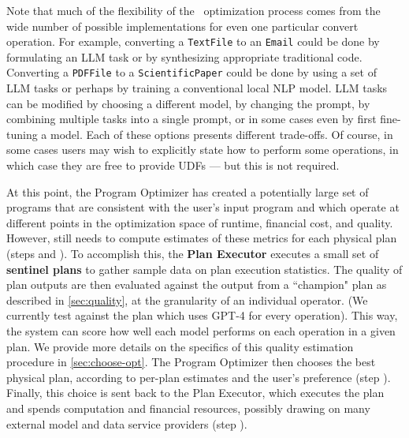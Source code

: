 Note that much of the flexibility of the \system\ optimization process comes from the wide number of possible implementations for even one particular convert operation. For example, converting a {\tt TextFile} to an {\tt Email} could be done by formulating an LLM task or by synthesizing appropriate traditional code. Converting a {\tt PDFFile} to a {\tt ScientificPaper} could be done by using a set of LLM tasks or perhaps by training a conventional local NLP model. LLM tasks can be modified by choosing a different model, by changing the prompt, by combining multiple tasks into a single prompt, or in some cases even by first fine-tuning a model. Each of these options presents different trade-offs. Of course, in some cases users may wish to explicitly state how to perform some operations, in which case they are free to provide UDFs --- but this is not required.

At this point, the Program Optimizer has created a potentially large set of programs that are consistent with the user's input program and which operate at different points in the optimization space of runtime, financial cost, and quality. However, \system{} still needs to compute estimates of these metrics for each physical plan (steps  and ). To accomplish this, the {\bf Plan Executor} executes a small set of {\bf sentinel plans} to gather sample data on plan execution statistics. The quality of plan outputs are then evaluated against the output from a ``champion" plan as described in \autoref{sec:quality}, at the granularity of an individual operator. (We currently test against the plan which uses GPT-4 for every operation). This way, the system can score how well each model performs on each operation in a given plan. We provide more details on the specifics of this quality estimation procedure in \autoref{sec:choose-opt}. The Program Optimizer then chooses the best physical plan, according to per-plan estimates and the user's preference (step ). Finally, this choice is sent back to the Plan Executor, which executes the plan and spends computation and financial resources, possibly drawing on many external model and data service providers (step ).




